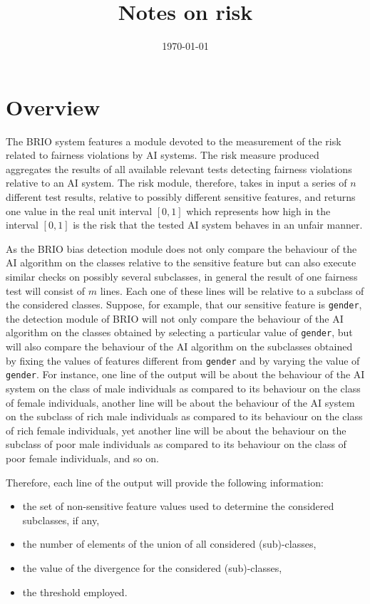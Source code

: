 \documentclass{article}
\title{Notes on risk}
\date{\today}
\newcommand{\brio}{BRIO}
\begin{document}
\maketitle
\tableofcontents

\section{Overview}
The \brio{} system features a module devoted to the measurement of the risk related to fairness violations by AI systems. The risk measure produced aggregates the results of all available relevant tests detecting fairness violations relative to an AI system. The risk module, therefore, takes in input a series of $n$ different test results, relative to possibly different sensitive features, and returns one value in the real unit interval $[0,1]$ which represents how high in the interval $[0,1]$ is the risk that the tested AI system behaves in an unfair manner.

As the \brio{} bias detection module does not only compare the behaviour of the AI algorithm on the  classes relative to the sensitive feature but can also execute similar checks on possibly several subclasses, in general the result of one fairness test will consist of $m$ lines. Each one of these lines will be relative to a subclass of the considered classes. Suppose, for example, that our sensitive feature is \texttt{gender}, the detection module of \brio{}  will not only compare the behaviour of the AI algorithm on the classes obtained by selecting a particular value of \texttt{gender}, but will also compare the behaviour of the AI algorithm on the subclasses obtained by fixing the values of features different from \texttt{gender} and by varying the value of \texttt{gender}. For instance, one line of the output will be about the behaviour of the AI system on the class of male individuals as compared to its behaviour on the class of female individuals, another line will be about the behaviour of the AI system on the subclass of rich male individuals as compared to its behaviour on the class of rich female individuals, yet another line will be about the behaviour on the subclass of poor male individuals as compared to its behaviour on the class of poor female individuals, and so on.

Therefore, each line of the output will provide the following information:

\begin{itemize}
\item the set of non-sensitive feature values used to determine the considered subclasses, if any,

\item the number of elements of the union of all considered (sub)-classes,

\item the value of the divergence for the considered (sub)-classes,

\item the threshold employed.
\end{itemize}
\end{document}
